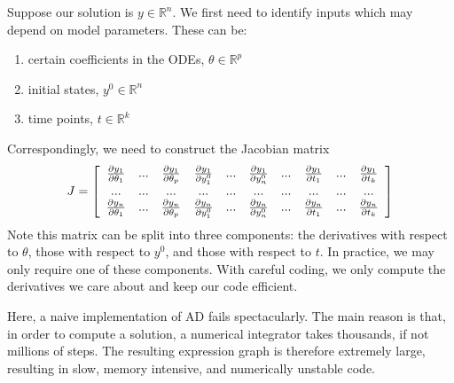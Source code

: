 \documentclass[11pt]{article}
\begin{document}
Suppose our solution is $y \in \mathbb R^n$. 
We first need to identify inputs which may depend on model parameters.
These can be:
%
\begin{enumerate}
  \item certain coefficients in the ODEs, $\theta \in \mathbb R^p$
  \item initial states, $y^0 \in \mathbb R^n$
  \item time points, $t \in \mathbb R^k$
\end{enumerate}
%
Correspondingly, we need to construct the Jacobian matrix
%
\begin{eqnarray*}
     J = \left[\begin{array}{c c c c c c c c c c}
	  \frac{\partial y_1}{\partial \theta_1} & . . . & \frac{\partial y_1}{\partial \theta_p} & \frac{\partial y_1}{\partial y_1^0} &...& \frac{\partial y_1}{\partial y_n^0} & ... &  \frac{\partial y_1}{\partial t_1} & ... & \frac{\partial y_1}{\partial t_k} \\
	    . . . & . . . & . . . & ... & ... & ... & ... & ... & ... & ... \\
	  \frac{\partial y_n}{\partial \theta_1} & . . . & \frac{\partial y_n}{\partial \theta_p} & \frac{\partial y_n}{\partial y_1^0} &...& \frac{\partial y_n}{\partial y_n^0} & ... &  \frac{\partial y_n}{\partial t_1} & ... & \frac{\partial y_n}{\partial t_k}
	\end{array}\right] 
\end{eqnarray*}
%
Note this matrix can be split into three components: the derivatives with respect to $\theta$, those with respect to $y^0$,
and those with respect to $t$. In practice, we may only require one of these components.
With careful coding, we only compute the derivatives we care about and keep our code efficient.

Here, a naive implementation of AD fails spectacularly.
The main reason is that, in order to compute a solution, a numerical integrator takes thousands,
if not millions of steps.
The resulting expression graph is therefore extremely large, resulting in slow, memory intensive,
and numerically unstable code.
\end{document}
